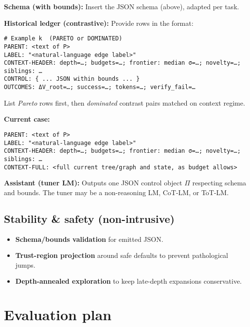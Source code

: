 \documentclass[11pt]{article}
\begin{document}
\noindent\textbf{Schema (with bounds):} Insert the JSON schema (above), adapted per task.

\noindent\textbf{Historical ledger (contrastive):} Provide rows in the format:
\begin{verbatim}
# Example k  (PARETO or DOMINATED)
PARENT: <text of P>
LABEL: "<natural-language edge label>"
CONTEXT-HEADER: depth=…; budgets=…; frontier: median σ=…; novelty=…; siblings: …
CONTROL: { ... JSON within bounds ... }
OUTCOMES: ΔV_root=…; success=…; tokens=…; verify_fail=…
\end{verbatim}
List \emph{Pareto} rows first, then \emph{dominated} contrast pairs matched on context regime.

\noindent\textbf{Current case:}
\begin{verbatim}
PARENT: <text of P>
LABEL: "<natural-language edge label>"
CONTEXT-HEADER: depth=…; budgets=…; frontier: median σ=…; novelty=…; siblings: …
CONTEXT-FULL: <full current tree/graph and state, as budget allows>
\end{verbatim}

\noindent\textbf{Assistant (tuner LM):} Outputs one JSON control object $\Pi$ respecting schema and bounds. The tuner may be a non-reasoning LM, CoT-LM, or ToT-LM.

\subsection{Stability \& safety (non-intrusive)}
\begin{itemize}[leftmargin=1.2em]
  \item \textbf{Schema/bounds validation} for emitted JSON.
  \item \textbf{Trust-region projection} around safe defaults to prevent pathological jumps.
  \item \textbf{Depth-annealed exploration} to keep late-depth expansions conservative.
\end{itemize}

\section{Evaluation plan}
\end{document}

